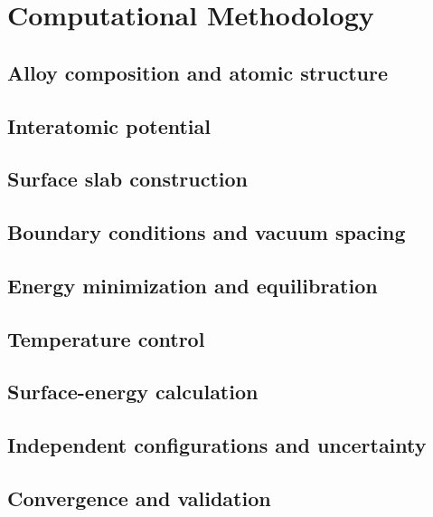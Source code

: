 \chapter{Computational Methodology}

\section{Alloy composition and atomic structure}
\section{Interatomic potential}
\section{Surface slab construction}
\section{Boundary conditions and vacuum spacing}
\section{Energy minimization and equilibration}
\section{Temperature control}
\section{Surface-energy calculation}
\section{Independent configurations and uncertainty}
\section{Convergence and validation}